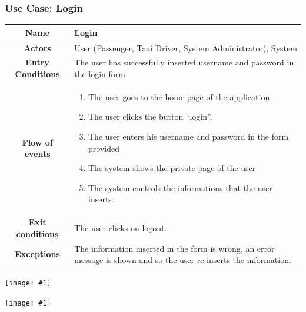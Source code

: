 \documentclass[11pt, a4paper,titlepage]{article}
\newcommand{\image}[1]{
	\begin{center}
		\noindent \texttt{[image: \#1]}
	\end{center}
	}
\begin{document}
\subsubsection{Use Case: Login}
	\begin{tabularx}{\textwidth}{| c | X |}
		\hline
		\textbf{Name} & 
			Login
			\\
		\hline
		\textbf{Actors} & 
			User (Passenger, Taxi Driver, System Administrator), System 
			\\
		\hline
		\textbf{Entry Conditions} &
			 The user has successfully inserted username and password in the login form 
			\\
		\hline
		\textbf{Flow of events} & 
			\begin{enumerate}
				\item The user goes to the home page of the application.
				\item The user clicks the button “login”.
				\item The user enters his username and password in the form provided
				\item The system shows the private page of the user
				\item The system controls the informations that the user inserts. 
				
			\end{enumerate}						
		\\
		\hline
		\textbf{Exit conditions} & 
			The user clicks on logout. 
			\\
		\hline
		\textbf{Exceptions} & 
			The information inserted in the form is wrong, an error message is shown and so the user re-inserts the information. 
			\\
		\hline		
	\end{tabularx}
	\image{usecase_login.png}
	\image{diagram_sequence_login.png}
	\newpage
\end{document}
